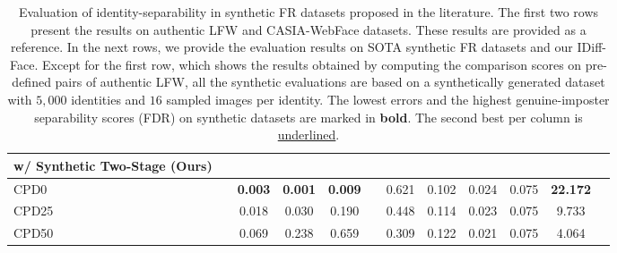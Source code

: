 \documentclass[10pt,twocolumn,letterpaper]{article}
\newcommand{\cacpdzeroshort}{CPD0 }
\newcommand{\cacpdtwentyfiveshort}{CPD25 }
\newcommand{\cacpdfiftyshort}{CPD50 }
\newcommand{\approachnamewithoutspace}{IDiff-Face}
\begin{document}
\begin{table}[t]
{\begin{tabular}{@{}lccccccccccc@{}}
    \cmidrule{1-1} \cmidrule{3-5} \cmidrule{7-12}\textbf{w/ Synthetic Two-Stage (Ours)} &&&&&&&&&&& \\
    \midrule
    {\cacpdzeroshort} && \textbf{0.003}   &  \textbf{0.001}  &  \textbf{0.009}  &&  0.621  &  0.102  &  0.024  &  0.075  &  \textbf{22.172}  \\
    {\cacpdtwentyfiveshort}  &&  0.018  &  0.030  &  0.190  &&  0.448  &  0.114  &  0.023  &  0.075  &  9.733  \\
    {\cacpdfiftyshort}  &&  0.069  &  0.238  &  0.659  &&  0.309  &  0.122  &  0.021 &  0.075  &  4.064  \\
    
    \bottomrule
    \end{tabular}
}
\vspace{-3mm}
\caption{Evaluation of identity-separability in synthetic FR datasets proposed in the literature.
The first two rows present the results on authentic LFW and CASIA-WebFace datasets. These results are provided as a reference. In the next rows, we provide the evaluation results on SOTA synthetic FR datasets and our \approachnamewithoutspace.
Except for the first row, which shows the results obtained by computing the comparison scores on pre-defined pairs of authentic LFW, all the synthetic evaluations are based on a synthetically generated dataset with $5{,}000$ identities and $16$ sampled images per identity. The lowest errors and the highest genuine-imposter separability scores (FDR) on synthetic datasets are marked in \textbf{bold}. The second best per column is \underline{underlined}. }
\label{tab:related_models_metrics_table}
\vspace{-2mm}
\end{table}
\end{document}
